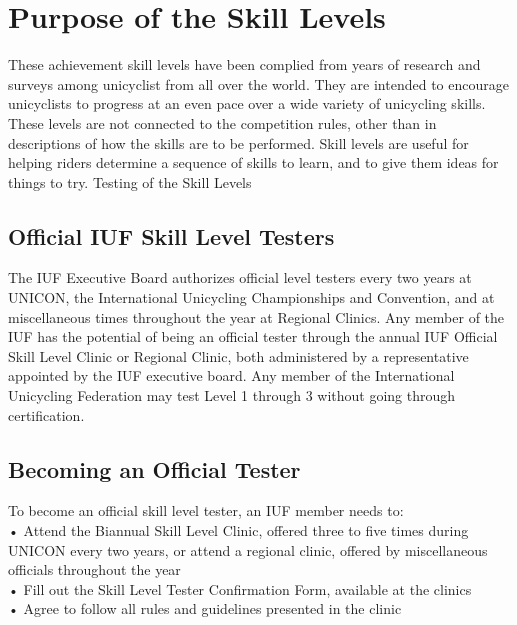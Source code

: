 \section{Purpose of the Skill Levels}
These achievement skill levels have been complied from years of research and surveys among unicyclist from all over the
world. They are intended to encourage unicyclists to progress at an even pace over a wide variety of unicycling skills.
These levels are not connected to the competition rules, other than in descriptions of how the skills are to be performed.
Skill levels are useful for helping riders determine a sequence of skills to learn, and to give them ideas for things to try.
Testing of the Skill Levels
\subsection{ Official IUF Skill Level Testers}
The IUF Executive Board authorizes official level testers every two years at UNICON, the International Unicycling
Championships and Convention, and at miscellaneous times throughout the year at Regional Clinics. Any member of
the IUF has the potential of being an official tester through the annual IUF Official Skill Level Clinic or Regional
Clinic, both administered by a representative appointed by the IUF executive board. Any member of the International
Unicycling Federation may test Level 1 through 3 without going through certification.
\subsection{ Becoming an Official Tester}
To become an official skill level tester, an IUF member needs to:\\
• Attend the Biannual Skill Level Clinic, offered three to five times during UNICON every two years, or attend a
regional clinic, offered by miscellaneous officials throughout the year\\
• Fill out the Skill Level Tester Confirmation Form, available at the clinics\\
• Agree to follow all rules and guidelines presented in the clinic\\
